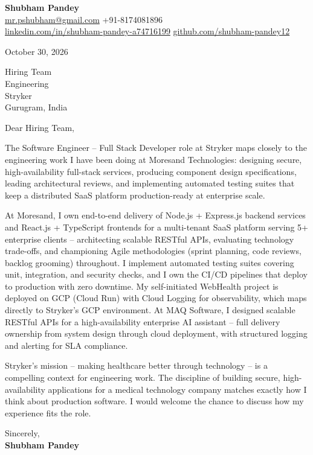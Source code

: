 \documentclass[a4paper,11pt]{article}
\begin{document}
\textbf{\Large Shubham Pandey}\\
\href{mailto:mr.pshubham@gmail.com}{mr.pshubham@gmail.com} \quad +91-8174081896\\
\href{https://www.linkedin.com/in/shubham-pandey-a74716199/}{linkedin.com/in/shubham-pandey-a74716199} \quad
\href{https://github.com/shubham-pandey12}{github.com/shubham-pandey12}

\vspace{1em}
October 30, 2026

\vspace{1em}
Hiring Team\\
Engineering\\
Stryker\\
Gurugram, India

\vspace{1em}
Dear Hiring Team,

The Software Engineer -- Full Stack Developer role at Stryker maps closely to the engineering work I have been doing at Moresand Technologies: designing secure, high-availability full-stack services, producing component design specifications, leading architectural reviews, and implementing automated testing suites that keep a distributed SaaS platform production-ready at enterprise scale.

At Moresand, I own end-to-end delivery of Node.js + Express.js backend services and React.js + TypeScript frontends for a multi-tenant SaaS platform serving 5+ enterprise clients -- architecting scalable RESTful APIs, evaluating technology trade-offs, and championing Agile methodologies (sprint planning, code reviews, backlog grooming) throughout. I implement automated testing suites covering unit, integration, and security checks, and I own the CI/CD pipelines that deploy to production with zero downtime. My self-initiated WebHealth project is deployed on GCP (Cloud Run) with Cloud Logging for observability, which maps directly to Stryker's GCP environment. At MAQ Software, I designed scalable RESTful APIs for a high-availability enterprise AI assistant -- full delivery ownership from system design through cloud deployment, with structured logging and alerting for SLA compliance.

Stryker's mission -- making healthcare better through technology -- is a compelling context for engineering work. The discipline of building secure, high-availability applications for a medical technology company matches exactly how I think about production software. I would welcome the chance to discuss how my experience fits the role.

\vspace{1em}
Sincerely,\\[0.5em]
\textbf{Shubham Pandey}
\end{document}
